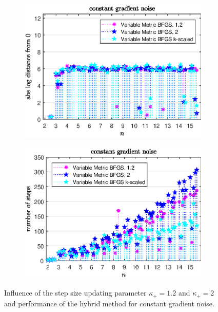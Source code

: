\vspace{-1.5em}

\begin{figure}[H]
	\begin{subfigure}{0.49\textwidth}
		\includegraphics[width=\textwidth]{Pictures/Plots/constant_gradient_noise_comp.eps}%
	\end{subfigure}
	\begin{subfigure}{0.49\textwidth}
		\includegraphics[width=\textwidth]{Pictures/Plots/steps_constant_gradient_noise_comp.eps}%
	\end{subfigure}
	\caption{Influence of the step size updating parameter \(\kappa_+ = 1.2\) and \(\kappa_+ =2 \) and performance of the hybrid method for constant gradient noise.}%
	\label{fig_const_grad_noise_comp}%
\end{figure}


